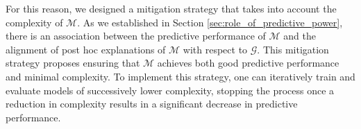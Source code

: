 \documentclass[mnsc,blindrev]{informs3}
\newcommand{\tw}[1]{\textcolor{red}{Tong: #1}}
\begin{document}
            
            For this reason, we designed a mitigation strategy that takes into account the complexity of $\mathcal{M}$. As we established in Section \ref{sec:role_of_predictive_power}, there is an association between the predictive performance of $\mathcal{M}$ and the alignment of post hoc explanations of $\mathcal{M}$ with respect to $\mathcal{G}$. This mitigation strategy proposes ensuring that $\mathcal{M}$ achieves both good predictive performance and minimal complexity.
            To implement this strategy, one can iteratively train and evaluate models of successively lower complexity, stopping the process once a reduction in complexity results in a significant decrease in predictive performance.
\end{document}
